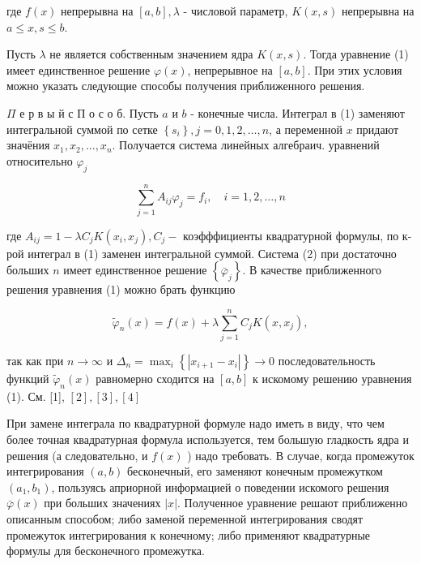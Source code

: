\documentclass[10pt]{article}
\begin{document}
где $f(x)$ непрерывна на $[a, b], \lambda$ - числовой параметр, $K(x, s)$ непрерывна на $a \leqslant x, s \leqslant b$.



Пусть $\lambda$ не является собственным значением ядра $K(x, s)$. Тогда уравнение (1) имеет единственное решение $\varphi(x)$, непрерывное на $[a, b]$. При этих условия можно указать следующие способы получения приближенного решения.



$\Pi$ е р в ы й с П о с о б. Пусть $a$ и $b$ - конечные числа. Интеграл в (1) заменяют интегральной суммой по сетке $\left\{s_{i}\right\}, j=0,1,2, \ldots, n$, а переменной $x$ придают значёния $x_{1}, x_{2}, \ldots, x_{n}$. Получается система линейных алгебраич. уравнений относительно $\varphi_{j}$



\[

\sum_{j=1}^{n} A_{i j} \varphi_{j}=f_{i}, \quad i=1,2, \ldots, n

\]



где $A_{i j}=1-\lambda C_{j} K\left(x_{i}, x_{j}\right), C_{j}-$ коэфффициенты квадратурной формулы, по к-рой интеграл в (1) заменен интегральной суммой. Система (2) при достаточно больших $n$ имеет единственное решение $\left\{\bar{\varphi}_{j}\right\}$. В качестве приближенного решения уравнения (1) можно брать функцию



\[

\tilde{\varphi}_{n}(x)=f(x)+\lambda \sum_{j=1}^{n} C_{j} K\left(x, x_{j}\right),

\]



так как при $n \longrightarrow \infty$ и $\Delta_{n}=\max _{i}\left\{\left|x_{i+1}-x_{i}\right|\right\} \longrightarrow 0$ последовательность функций $\tilde{\varphi}_{n}(x)$ равномерно сходится на $[a, b]$ к искомому решению уравнения (1). См. [1], $[2],[3],[4]$



При замене интеграла по квадратурной формуле надо иметь в виду, что чем более точная квадратурная формула используется, тем большую гладкость ядра и решения (а следовательно, и $f(x)$ ) надо требовать. В случае, когда промежуток интегрирования $(a, b)$ бесконечный, его заменяют конечным промежутком $\left(a_{1}, b_{1}\right)$, пользуясь априорной информацией о поведении искомого решения $\bar{\varphi}(x)$ при больших значениях $|x|$. Полученное уравнение решают приближенно описанным способом; либо заменой переменной интегрирования сводят промежуток интегрирования к конечному; либо применяют квадратурные формулы для бесконечного промежутка.
\end{document}
